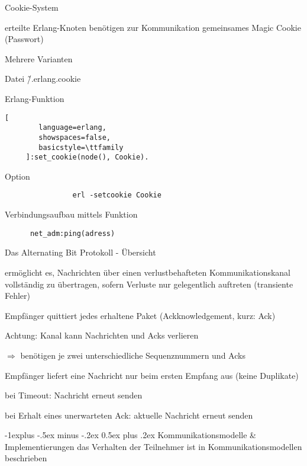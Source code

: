 \documentclass[10pt]{article}
\makeatletter
\renewcommand{\subsection}{\@startsection{subsection}{2}{0mm}%
                                {-1explus -.5ex minus -.2ex}%
                                {0.5ex plus .2ex}%
                                {\normalfont\normalsize\bfseries}}
\makeatother
\begin{document}
\begin{itemize*}
Cookie-System
\begin{itemize*}
  \item erteilte Erlang-Knoten benötigen zur Kommunikation gemeinsames Magic Cookie (Passwort)
  \item Mehrere Varianten
  \begin{itemize*}
    \item Datei \~/.erlang.cookie
    \item Erlang-Funktion
    \begin{lstlisting}[
        language=erlang,
        showspaces=false,
        basicstyle=\ttfamily
     ]:set_cookie(node(), Cookie).
    \end{lstlisting}
    \item Option
    \begin{lstlisting}
                erl -setcookie Cookie
              \end{lstlisting}
  \end{itemize*}
  \item Verbindungsaufbau mittels Funktion
  \begin{lstlisting}
      net_adm:ping(adress)
    \end{lstlisting}
\end{itemize*}

Das Alternating Bit Protokoll - Übersicht
\begin{itemize*}
  \item ermöglicht es, Nachrichten über einen verlustbehafteten Kommunikationskanal vollständig zu übertragen, sofern Verluste nur gelegentlich auftreten (transiente Fehler)
  \item Empfänger quittiert jedes erhaltene Paket (Ackknowledgement, kurz: Ack)
  \item Achtung: Kanal kann Nachrichten und Acks verlieren
  \begin{itemize*}
    \item $\Rightarrow$ benötigen je zwei unterschiedliche Sequenznummern und Acks
  \end{itemize*}
  \item Empfänger liefert eine Nachricht nur beim ersten Empfang aus (keine Duplikate)
  \item bei Timeout: Nachricht erneut senden
  \item bei Erhalt eines unerwarteten Ack: aktuelle Nachricht erneut senden
\end{itemize*}

\subsection{Kommunikationsmodelle \& Implementierungen}
das Verhalten der Teilnehmer ist in Kommunikationsmodellen beschrieben


\end{itemize*}
\end{document}
